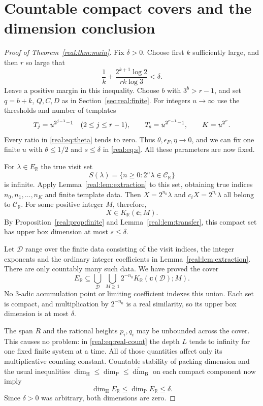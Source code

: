 \documentclass[11pt]{article}
\theoremstyle{definition}
\theoremstyle{remark}
\newcommand{\R}{\mathbb R}
\newcommand{\CR}{\mathcal C_{\R}}
\newcommand{\ER}{E_{\R}}
\newcommand{\dimH}{\dim_{\mathrm H}}
\newcommand{\dimP}{\dim_{\mathrm P}}
\newcommand{\dimB}{\overline{\dim}_{\mathrm B}}
\begin{document}
\section{Countable compact covers and the dimension conclusion}
\begin{proof}[Proof of Theorem~\ref{real:thm:main}]
Fix $\delta>0$. Choose first $k$ sufficiently large, and then $r$ so
large that
\[
             \frac1k+\frac{2^{k+1}\log2}{rk\log3}<\delta.
\]
Leave a positive margin in this inequality. Choose $b$ with $3^b>r-1$,
and set $q=b+k$, $Q,C,D$ as in Section~\ref{sec:real:finite}. For integers $u\to\infty$
use the thresholds and number of templates
\[
 T_j=u^{2^{j-1}-1}\quad(2\le j\le r-1),\qquad
 T_{\rm s}=u^{2^{r-1}-1},\qquad K=u^{2^r}.
\]
Every ratio in \eqref{real:eq:theta} tends to zero. Thus
$\theta,\epsilon_F,\eta\to0$, and we can fix one finite $u$ with
$\theta\le1/2$ and $s\le\delta$ in \eqref{real:eq:s}.
All these parameters are now fixed.

For $\lambda\in\ER$ the true visit set
\[
                  S(\lambda)=\{n\ge0:2^n\lambda\in\CR\}
\]
is infinite. Apply Lemma~\ref{real:lem:extraction} to this set, obtaining
true indices $n_0,n_1,\ldots,n_K$ and finite template data. Then
$X=2^{n_0}\lambda$ and $c_iX=2^{n_i}\lambda$ all belong to $\CR$.
For some positive integer $M$, therefore,
\[
                 X\in K_{\R}(\boldsymbol c;M).
\]
By Proposition~\ref{real:prop:finite} and Lemma~\ref{real:lem:transfer}, this
compact set has upper box dimension at most $s\le\delta$.

Let $\mathcal D$ range over the finite data consisting of the visit
indices, the integer exponents and the ordinary integer coefficients
in Lemma~\ref{real:lem:extraction}. There are only countably many such data.
We have proved the cover
\begin{equation}\label{real:eq:cover}
 \ER\subseteq\bigcup_{\mathcal D}\ \bigcup_{M\ge1}
       2^{-n_0}K_{\R}(\boldsymbol c(\mathcal D);M).
\end{equation}
No 3-adic accumulation point or limiting coefficient indexes this union.
Each set is compact, and multiplication by $2^{-n_0}$ is a real
similarity, so its upper box dimension is at most $\delta$.

The span $R$ and the rational heights $p_i,q_i$ may be unbounded across
the cover. This causes no problem: in \eqref{real:eq:real-count} the depth
$L$ tends to infinity for one fixed finite system at a time. All of
those quantities affect only its multiplicative counting constant.
Countable stability of packing dimension and the usual inequalities
$\dimH\le\dimP\le\dimB$ on each compact component now imply
\[
                         \dimH\ER\le\dimP\ER\le\delta.
\]
Since $\delta>0$ was arbitrary, both dimensions are zero.
\end{proof}
\end{document}
